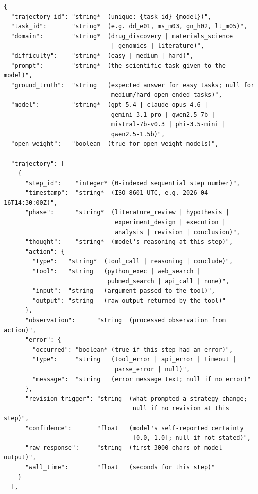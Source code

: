 \documentclass{article}
\newcommand{\dataset}{\textsc{OpenDiscoveryTrace}\xspace}
\begin{document}
\begin{lstlisting}[style=json, caption={Complete \dataset JSON schema for a single trajectory.}, label=lst:schema]
{
  "trajectory_id": "string*  (unique: {task_id}_{model})",
  "task_id":       "string*  (e.g. dd_e01, ms_m03, gn_h02, lt_m05)",
  "domain":        "string*  (drug_discovery | materials_science
                              | genomics | literature)",
  "difficulty":    "string*  (easy | medium | hard)",
  "prompt":        "string*  (the scientific task given to the model)",
  "ground_truth":  "string   (expected answer for easy tasks; null for
                              medium/hard open-ended tasks)",
  "model":         "string*  (gpt-5.4 | claude-opus-4.6 |
                              gemini-3.1-pro | qwen2.5-7b |
                              mistral-7b-v0.3 | phi-3.5-mini |
                              qwen2.5-1.5b)",
  "open_weight":   "boolean  (true for open-weight models)",

  "trajectory": [
    {
      "step_id":    "integer* (0-indexed sequential step number)",
      "timestamp":  "string*  (ISO 8601 UTC, e.g. 2026-04-16T14:30:00Z)",
      "phase":      "string*  (literature_review | hypothesis |
                               experiment_design | execution |
                               analysis | revision | conclusion)",
      "thought":    "string*  (model's reasoning at this step)",
      "action": {
        "type":   "string*  (tool_call | reasoning | conclude)",
        "tool":   "string   (python_exec | web_search |
                             pubmed_search | api_call | none)",
        "input":  "string   (argument passed to the tool)",
        "output": "string   (raw output returned by the tool)"
      },
      "observation":      "string  (processed observation from action)",
      "error": {
        "occurred": "boolean* (true if this step had an error)",
        "type":     "string   (tool_error | api_error | timeout |
                               parse_error | null)",
        "message":  "string   (error message text; null if no error)"
      },
      "revision_trigger": "string  (what prompted a strategy change;
                                    null if no revision at this step)",
      "confidence":       "float   (model's self-reported certainty
                                    [0.0, 1.0]; null if not stated)",
      "raw_response":     "string  (first 3000 chars of model output)",
      "wall_time":        "float   (seconds for this step)"
    }
  ],


\end{lstlisting}
\end{document}
